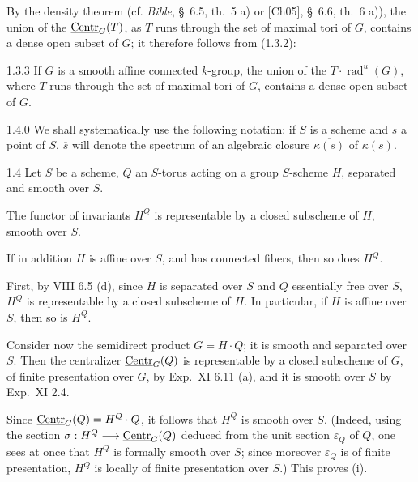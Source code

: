 By the density theorem (cf. \textit{Bible}, \S~6.5, th.~5 a) or [Ch05], \S~6.6, th.~6 a)), the union of the $\underline{\mathrm{Centr}}_G(T)$, as $T$ runs through the set of maximal tori of $G$, contains a dense open subset of $G$; it therefore follows from (1.3.2):
\begin{corollary}{1.3.3}\label{XIX.1.3.3}
If $G$ is a smooth affine connected $k$-group, the union of the $T\cdot\operatorname{rad}^{u}(G)$, where $T$ runs through the set of maximal tori of $G$, contains a dense open subset of $G$.
\end{corollary}

\begin{notation}{1.4.0}\label{XIX.1.4.0}
{\renewcommand{\thefootnote}{(5)}}%
We shall systematically use the following notation: if $S$ is a scheme and $s$ a point of $S$, $\overline{s}$ will denote the spectrum of an algebraic closure $\overline{\kappa(s)}$ of $\kappa(s)$.
\end{notation}

\begin{lemma}{1.4}\label{XIX.1.4}
{\renewcommand{\thefootnote}{(5)}\footnotemark}%
Let $S$ be a scheme, $Q$ an $S$-torus acting on a group $S$-scheme $H$, separated and smooth over $S$.
\begin{enumeratei}
\item The functor of invariants $H^Q$ is representable by a closed subscheme of $H$, smooth over $S$.
\item If in addition $H$ is affine over $S$, and has connected fibers, then so does $H^Q$.
\end{enumeratei}
\end{lemma}
First, by VIII 6.5 (d),{\renewcommand{\thefootnote}{(6)}} since $H$ is separated over $S$ and $Q$ essentially free over $S$, $H^Q$ is representable by a closed subscheme of $H$. In particular, if $H$ is affine over $S$, then so is $H^Q$.

Consider now the semidirect product $G=H\cdot Q$; it is smooth and separated over $S$. Then the centralizer $\underline{\mathrm{Centr}}_G(Q)$ is representable by a closed subscheme of $G$, of finite presentation over $G$, by Exp.~XI 6.11 (a),{\renewcommand{\thefootnote}{(6)}\footnotemark} and it is smooth over $S$ by Exp.~XI 2.4.

Since $\underline{\mathrm{Centr}}_G(Q)=H^Q\cdot Q$, it follows that $H^Q$ is smooth over $S$. (Indeed, using the section $\sigma:H^Q\longrightarrow\underline{\mathrm{Centr}}_G(Q)$ deduced from the unit section $\varepsilon_Q$ of $Q$, one sees at once that $H^Q$ is formally smooth over $S$; since moreover $\varepsilon_Q$ is of finite presentation, $H^Q$ is locally of finite presentation over $S$.) This proves (i).

